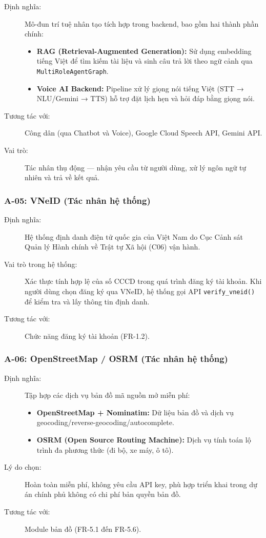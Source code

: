 \begin{description}
  \item[Định nghĩa:] Mô-đun trí tuệ nhân tạo tích hợp trong backend,
    bao gồm hai thành phần chính:
    \begin{itemize}
      \item \textbf{RAG (Retrieval-Augmented Generation):} Sử dụng
        embedding tiếng Việt để tìm kiếm tài liệu và sinh câu trả lời
        theo ngữ cảnh qua \texttt{MultiRoleAgentGraph}.
      \item \textbf{Voice AI Backend:} Pipeline xử lý giọng nói tiếng Việt
        (STT → NLU/Gemini → TTS) hỗ trợ đặt lịch hẹn và hỏi đáp
        bằng giọng nói.
    \end{itemize}
  \item[Tương tác với:] Công dân (qua Chatbot và Voice),
    Google Cloud Speech API, Gemini API.
  \item[Vai trò:] Tác nhân thụ động — nhận yêu cầu từ người dùng,
    xử lý ngôn ngữ tự nhiên và trả về kết quả.
\end{description}

\subsubsection{A-05: VNeID (Tác nhân hệ thống)}

\begin{description}
  \item[Định nghĩa:] Hệ thống định danh điện tử quốc gia của Việt Nam
    do Cục Cảnh sát Quản lý Hành chính về Trật tự Xã hội (C06)
    vận hành.
  \item[Vai trò trong hệ thống:] Xác thực tính hợp lệ của số CCCD
    trong quá trình đăng ký tài khoản. Khi người dùng chọn
    đăng ký qua VNeID, hệ thống gọi API \texttt{verify\_vneid()}
    để kiểm tra và lấy thông tin định danh.
  \item[Tương tác với:] Chức năng đăng ký tài khoản (FR-1.2).
\end{description}

\subsubsection{A-06: OpenStreetMap / OSRM (Tác nhân hệ thống)}

\begin{description}
  \item[Định nghĩa:] Tập hợp các dịch vụ bản đồ mã nguồn mở miễn phí:
    \begin{itemize}
      \item \textbf{OpenStreetMap + Nominatim:} Dữ liệu bản đồ và
        dịch vụ geocoding/reverse-geocoding/autocomplete.
      \item \textbf{OSRM (Open Source Routing Machine):} Dịch vụ
        tính toán lộ trình đa phương thức (đi bộ, xe máy, ô tô).
    \end{itemize}
  \item[Lý do chọn:] Hoàn toàn miễn phí, không yêu cầu API key,
    phù hợp triển khai trong dự án chính phủ không có chi phí
    bản quyền bản đồ.
  \item[Tương tác với:] Module bản đồ (FR-5.1 đến FR-5.6).
\end{description}
